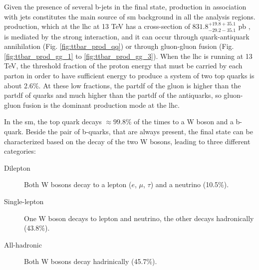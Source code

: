 Given the presence of several b-jets in the final state, \ttbar production in association with jets constitutes the main source of \gls{sm} background in all the analysis regions. \ttbar production, which at the \gls{lhc} at 13 TeV has a cross-section of $831.8^{+19.8 + 35.1}_{-29.2-35.1}$ pb \cite{Czakon:2013goa}, is mediated by the strong interaction, and it can occur through quark-antiquark annihilation (Fig. \ref{fig:ttbar_prod_qq}) or through gluon-gluon fusion (Fig. \ref{fig:ttbar_prod_gg_1} to \ref{fig:ttbar_prod_gg_3}). When the \gls{lhc} is running at 13 TeV, the threshold fraction of the proton energy that must be carried by each parton in order to have sufficient energy to produce a system of two top quarks 
is about 2.6\%.
At these low fractions, the \gls{partdf} of the gluon is higher than the \gls{partdf} of quarks and much higher than the \gls{partdf} of the antiquarks, so gluon-gluon fusion is the dominant \ttbar production mode at the \gls{lhc}.


In the \gls{sm}, the top quark decays $\approx 99.8$\% of the times to a W boson and a b-quark. 
Beside the pair of b-quarks, that are always present, the final state can be characterized based on the decay of the two W bosons, leading to three different categories:
\begin{description}
\item[Dilepton]  Both W bosons decay to a lepton ($e$, $\mu$, $\tau$) and a neutrino (10.5\%).
\item[Single-lepton] One W boson decays to lepton and neutrino, the other decays hadronically (43.8\%).
\item[All-hadronic] Both W bosons decay hadrinically (45.7\%).
\end{description}

